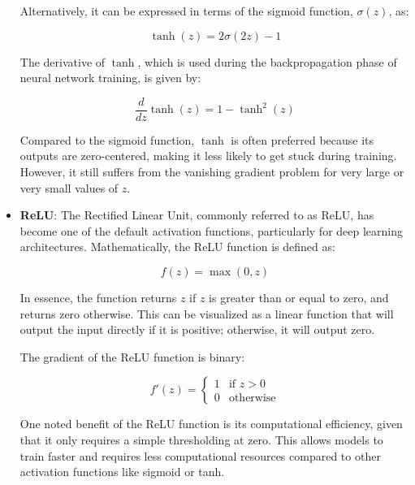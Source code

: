 \begin{itemize}
Alternatively, it can be expressed in terms of the sigmoid function, \( \sigma(z) \), as:

\[
\tanh(z) = 2\sigma(2z) - 1
\]

The derivative of \( \tanh \), which is used during the backpropagation phase of neural network training, is given by:

\[
\frac{d}{dz}\tanh(z) = 1 - \tanh^2(z)
\]

Compared to the sigmoid function, \( \tanh \) is often preferred because its outputs are zero-centered, making it less likely to get stuck during training. However, it still suffers from the vanishing gradient problem for very large or very small values of \( z \).
	
	\item \textbf{ReLU}: 
The Rectified Linear Unit, commonly referred to as ReLU, has become one of the default activation functions, particularly for deep learning architectures. Mathematically, the ReLU function is defined as:

\[
f(z) = \max(0, z)
\]

In essence, the function returns \( z \) if \( z \) is greater than or equal to zero, and returns zero otherwise. This can be visualized as a linear function that will output the input directly if it is positive; otherwise, it will output zero.

The gradient of the ReLU function is binary:

\[
f'(z) = 
\begin{cases} 
1 & \text{if } z > 0 \\
0 & \text{otherwise}
\end{cases}
\]

One noted benefit of the ReLU function is its computational efficiency, given that it only requires a simple thresholding at zero. This allows models to train faster and requires less computational resources compared to other activation functions like sigmoid or tanh.


\end{itemize}
